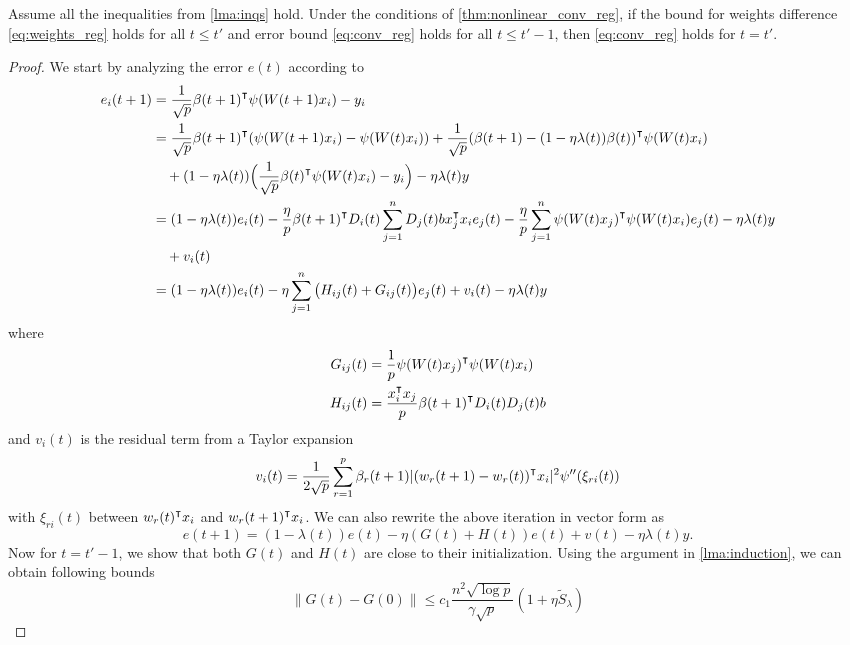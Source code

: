 \begin{lemma}
\label{lma:induction_reg}
Assume all the inequalities from \cref{lma:inqs} hold. Under the conditions of \cref{thm:nonlinear_conv_reg}, if the bound for weights difference \eqref{eq:weights_reg} holds for all $t\leq t'$ and error bound \eqref{eq:conv_reg} holds for all $t\leq t'-1$, then \eqref{eq:conv_reg} holds for $t=t'$.
\end{lemma}
\begin{proof}
We start by analyzing the error $e(t)$ according to 
\begin{equation*}
\begin{aligned}
    e_i(t+1)
    &= \frac{1}{\sqrt p}\beta(t+1)\transpose\psi(W(t+1)x_i) - y_i \\
    &= \frac{1}{\sqrt p}\beta(t+1)\transpose(\psi(W(t+1)x_i)-\psi(W(t)x_i))+ \frac{1}{\sqrt p}(\beta(t+1)-(1-\eta\lambda(t))\beta(t))\transpose \psi(W(t)x_i) \\
    & \quad + (1-\eta\lambda(t))\Big(\frac{1}{\sqrt p}\beta(t)\transpose \psi(W(t)x_i) - y_i\Big) - \eta\lambda(t)y \\
    &=(1-\eta\lambda(t))e_i(t) - \frac{\eta}{p}\beta(t+1)\transpose D_i(t)\sum_{j=1}^nD_j(t)b x_j\transpose x_i e_j(t)  - \frac{\eta}{p}\sum_{j=1}^n\psi(W(t)x_j)\transpose\psi(W(t)x_i)e_j(t) - \eta\lambda(t)y\\
    & \quad + v_i(t) \\
    & = (1-\eta\lambda(t))e_i(t)-\eta\sum_{j=1}^n\big(H_{ij}(t)+G_{ij}(t)\big)e_j(t) + v_i(t) - \eta\lambda(t)y
\end{aligned}
\end{equation*}
where
\begin{equation*}
\begin{aligned}
G_{ij}(t) &= \frac{1}{p}\psi(W(t)x_j)\transpose\psi(W(t)x_i) \\
H_{ij}(t) &= \frac{x_i\transpose x_j}{p}\beta(t+1)\transpose D_i(t)D_j(t)b
\end{aligned}
\end{equation*}
and $v_i(t)$ is the residual term from a Taylor expansion
\begin{equation*}
    v_i(t) = \frac{1}{2\sqrt p}\sum_{r=1}^p\beta_r(t+1)|(w_r(t+1)-w_r(t))\transpose x_i|^2\psi''(\xi_{ri}(t))
\end{equation*}
with $\xi_{ri}(t)$ between $w_r(t)\transpose x_i$ and $w_r(t+1)\transpose x_i$. We can also rewrite the above iteration in vector form as
\begin{equation}\label{eq:et_iter_reg}
     e(t+1) = (1-\lambda(t))e(t) - \eta(G(t)+H(t))e(t) + v(t) -\eta\lambda(t)y.
\end{equation}
Now for $t=t'-1$, we show that both $G(t)$ and $H(t)$ are close to their initialization. Using the argument in \cref{lma:induction}, we can obtain following bounds
\begin{equation}\label{eq:bound_Gt_reg}
    \|G(t)-G(0)\| \leq c_1 \frac{n^2\sqrt{\log p}}{\gamma\sqrt p}(1+\eta \tilde{S}_\lambda)
\end{equation}


\end{proof}
